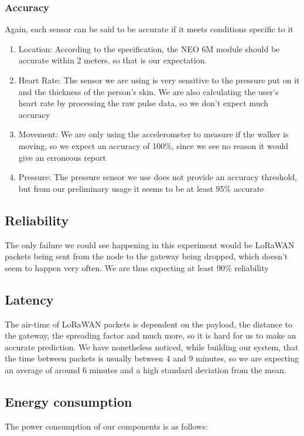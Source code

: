 		\subsubsection{Accuracy}
			Again, each sensor can be said to be accurate if it meets conditions specific to it 

			\begin{enumerate}
				\item Location: According to the specification, the NEO 6M module should be accurate within 2 meters, so that is our expectation.
				\item Heart Rate: The sensor we are using is very sensitive to the pressure put on it and the thickness of the person's skin. We are also calculating the user's heart rate by processing the raw pulse data, so we don't expect much accuracy
				\item Movement: We are only using the accelerometer to measure if the walker is moving, so we expect an accuracy of 100\%, since we see no reason it would give an erroneous report
				\item Pressure: The pressure sensor we use does not provide an accuracy threshold, but from our preliminary usage it seems to be at least 95\% accurate
			\end{enumerate}

		\subsection{Reliability}
			The only failure we could see happening in this experiment would be LoRaWAN packets being sent from the node to the gateway being dropped, which doesn't seem to happen very often. We are thus expecting at least 90\% reliability

		\subsection{Latency}
			The air-time of LoRaWAN packets is dependent on the payload, the distance to the gateway, the spreading factor and much more, so it is hard for us to make an accurate prediction. We have nonetheless noticed, while building our system, that the time between packets is usually between 4 and 9 minutes, so we are expecting an average of around 6 minutes and a high standard deviation from the mean.
		\newline
		\newline
		\newline
		\subsection{Energy consumption}
			The power consumption of our components is as follows:

